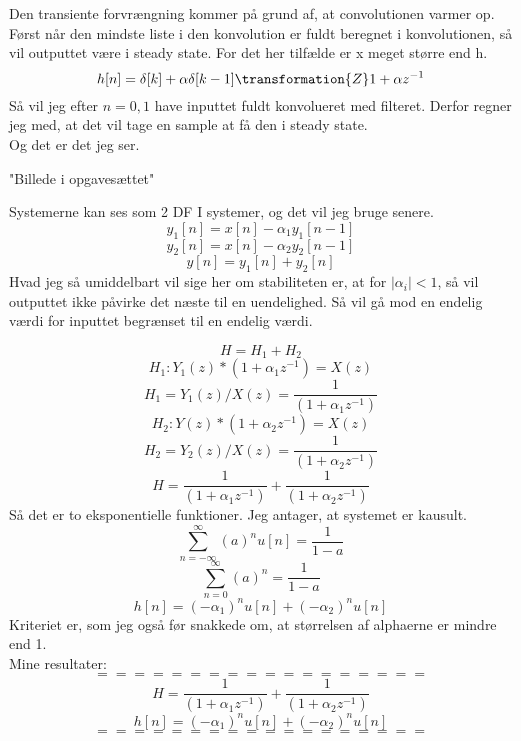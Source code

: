 \begin{rubrik}
\begin{eksamensOpgave}
        \begin{UnderOpgave}
            Den transiente forvrængning kommer på grund af, at convolutionen varmer op. Først når den mindste liste i den konvolution er fuldt beregnet i konvolutionen, så vil outputtet være i steady state.
            For det her tilfælde er x meget større end h. 
            \[h[n] = \delta[k] + \alpha \delta[k - 1] \transformation{Z} 1 + \alpha z^{-1}\]
            Så vil jeg efter $n = 0, 1$ have inputtet fuldt konvolueret med filteret. 
            Derfor regner jeg med, at det vil tage en sample at få den i steady state.
            \\
            Og det er det jeg ser. 
        \end{UnderOpgave}
    \end{eksamensOpgave}
    \begin{eksamensOpgave}
        "Billede i opgavesættet"
        \begin{UnderOpgave}
            Systemerne kan ses som 2 DF I systemer, og det vil jeg bruge senere. 
            \[y_1[n] = x[n] - \alpha_1y_1[n - 1]\]
            \[y_2[n] = x[n] - \alpha_2y_2[n - 1]\]
            \[y[n] = y_1[n] + y_2[n]\]
            Hvad jeg så umiddelbart vil sige her om stabiliteten er, at for $|\alpha_i| < 1$, så vil outputtet ikke påvirke det næste til en uendelighed. 
            Så vil gå mod en endelig værdi for inputtet begrænset til en endelig værdi. 
        \end{UnderOpgave}
        \begin{UnderOpgave}
            \[H = H_1 + H_2\]
            \[H_1 : Y_1(z)*(1 + \alpha_1z^{-1}) = X(z)\]
            \[H_1 = Y_1(z)/X(z) = \frac{1}{(1 + \alpha_1z^{-1})}\]
            \[H_2 : Y(z)*(1 + \alpha_2z^{-1}) = X(z)\]
            \[H_2 = Y_2(z)/X(z) = \frac{1}{(1 + \alpha_2z^{-1})}\]
            \[H = \frac{1}{(1 + \alpha_1z^{-1})} + \frac{1}{(1 + \alpha_2z^{-1})}\]
            Så det er to eksponentielle funktioner. Jeg antager, at systemet er kausult. 
            \[\sum_{n = -\infty}^{\infty}(a)^nu[n] = \frac{1}{1 - a}\]
            \[\sum_{n = 0}^{\infty}(a)^n = \frac{1}{1 - a}\]
            \[h[n] = (-\alpha_1)^nu[n] + (-\alpha_2)^nu[n]\]
            Kriteriet er, som jeg også før snakkede om, at størrelsen af alphaerne er mindre end 1. \\
            Mine resultater: 
            \[==================\]
            \[H = \frac{1}{(1 + \alpha_1z^{-1})} + \frac{1}{(1 + \alpha_2z^{-1})}\]
            \[h[n] = (-\alpha_1)^nu[n] + (-\alpha_2)^nu[n]\]
            \[==================\]
            

\end{UnderOpgave}
\end{eksamensOpgave}
\end{rubrik}
